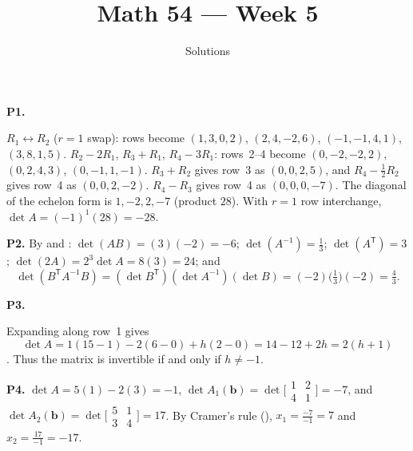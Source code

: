 \documentclass[10pt]{scrartcl}
\title{Math 54 --- Week 5}
\subtitle{Solutions}
\author{}\date{}\ihead{}
\newcommand{\vv}[1]{\mathbf{#1}}
\begin{document}
\maketitle

\begin{prob}\textbf{P1.}\par{}
\begin{steps}
  \ii $R_1\leftrightarrow R_2$ ($r=1$ swap): rows become $(1,3,0,2)$, $(2,4,-2,6)$, $(-1,-1,4,1)$, $(3,8,1,5)$.
  \ii $R_2-2R_1$, $R_3+R_1$, $R_4-3R_1$: rows~2--4 become $(0,-2,-2,2)$, $(0,2,4,3)$, $(0,-1,1,-1)$.
  \ii $R_3+R_2$ gives row~3 as $(0,0,2,5)$, and $R_4-\tfrac12R_2$ gives row~4 as $(0,0,2,-2)$.
  \ii $R_4-R_3$ gives row~4 as $(0,0,0,-7)$. The diagonal of the echelon form is $1,-2,2,-7$ (product $28$).
  \ii With $r=1$ row interchange, $\det A=(-1)^1(28)=-28$.
\end{steps}
\end{prob}

\begin{prob}\textbf{P2.}
By  and : $\det(AB)=(3)(-2)=-6$; $\det(A^{-1})=\tfrac13$; $\det(A^{\mathsf T})=3$; $\det(2A)=2^3\det A=8(3)=24$; and
\[
  \det(B^{\mathsf T}A^{-1}B)=(\det B^{\mathsf T})(\det A^{-1})(\det B)=(-2)\big(\tfrac13\big)(-2)=\tfrac43.
\]
\end{prob}

\begin{prob}\textbf{P3.}\par{}
Expanding along row~1 gives 
\[
  \det A=1(15-1)-2(6-0)+h(2-0)=14-12+2h=2(h+1)
\]
. Thus the matrix is invertible if and only if $h\ne-1$.
\end{prob}

\begin{prob}\textbf{P4.}
$\det A=5(1)-2(3)=-1$, $\det A_1(\vv b)=\det\bigl[\begin{smallmatrix}1&2\\4&1\end{smallmatrix}\bigr]=-7$, and $\det A_2(\vv b)=\det\bigl[\begin{smallmatrix}5&1\\3&4\end{smallmatrix}\bigr]=17$. By Cramer's rule (), $x_1=\frac{-7}{-1}=7$ and $x_2=\frac{17}{-1}=-17$.
\end{prob}
\end{document}
